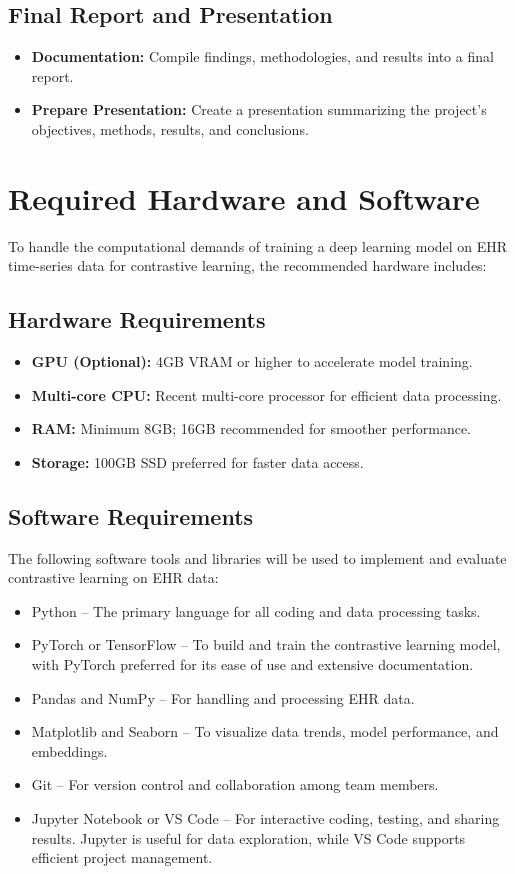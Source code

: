 \documentclass[a4paper]{article}
\begin{document}
    \subsection*{Final Report and Presentation}
    \begin{itemize}
        \item \textbf{Documentation:} Compile findings, methodologies, and results into a final report.
        \item \textbf{Prepare Presentation:} Create a presentation summarizing the project’s objectives, methods, results, and conclusions.
    \end{itemize}

    
\section{Required Hardware and Software}
To handle the computational demands of training a deep learning model on EHR time-series data for contrastive learning, the recommended hardware includes:
\subsection{Hardware Requirements}
\begin{itemize}
    \item \textbf{GPU (Optional):} 4GB VRAM or higher to accelerate model training.
    \item \textbf{Multi-core CPU:} Recent multi-core processor for efficient data processing.
    \item \textbf{RAM:} Minimum 8GB; 16GB recommended for smoother performance.
    \item \textbf{Storage:} 100GB SSD preferred for faster data access.
\end{itemize}


\subsection{Software Requirements}

The following software tools and libraries will be used to implement and evaluate contrastive learning on EHR data:

\begin{itemize}
    \item Python – The primary language for all coding and data processing tasks.
    \item PyTorch or TensorFlow – To build and train the contrastive learning model, with PyTorch preferred for its ease of use and extensive documentation.
    \item Pandas and NumPy – For handling and processing EHR data.
    \item Matplotlib and Seaborn – To visualize data trends, model performance, and embeddings.
    \item Git – For version control and collaboration among team members.
    \item Jupyter Notebook or VS Code – For interactive coding, testing, and sharing results. Jupyter is useful for data exploration, while VS Code supports efficient project management.
\end{itemize}
\end{document}
